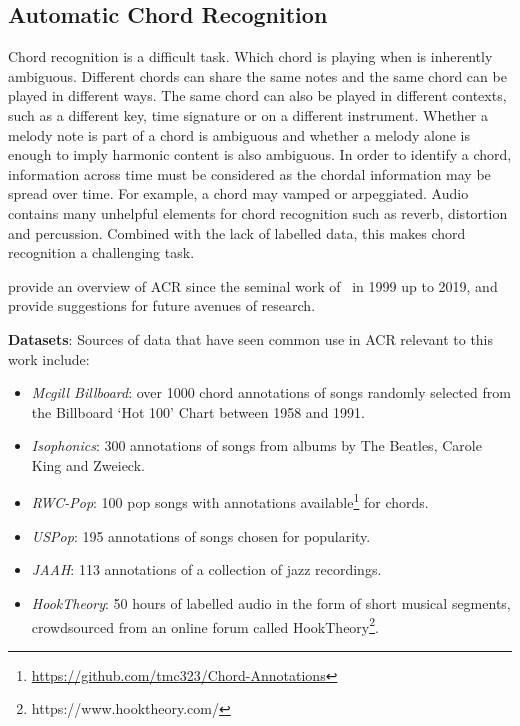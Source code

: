 \subsection{Automatic Chord Recognition}\label{sec:background-acr}

Chord recognition is a difficult task. Which chord is playing when is inherently ambiguous. Different chords can share the same notes and the same chord can be played in different ways. The same chord can also be played in different contexts, such as a different key, time signature or on a different instrument. Whether a melody note is part of a chord is ambiguous and whether a melody alone is enough to imply harmonic content is also ambiguous. In order to identify a chord, information across time must be considered as the chordal information may be spread over time. For example, a chord may vamped or arpeggiated. Audio contains many unhelpful elements for chord recognition such as reverb, distortion and percussion. Combined with the lack of labelled data, this makes chord recognition a challenging task.

\citet{20YearsofACR} provide an overview of ACR since the seminal work of~\citet{FujishimaACR} in 1999 up to 2019, and provide suggestions for future avenues of research.


\textbf{Datasets}: Sources of data that have seen common use in ACR relevant to this work include:
\begin{itemize}
    \item \emph{Mcgill Billboard}: over 1000 chord annotations of songs randomly selected from the Billboard `Hot 100' Chart between 1958 and 1991.~\citep{McgillBillboard}
    \item \emph{Isophonics}: 300 annotations of songs from albums by The Beatles, Carole King and Zweieck.~\citep{Isophonics}
    \item \emph{RWC-Pop}: 100 pop songs with annotations available\footnote{\url{https://github.com/tmc323/Chord-Annotations}} for chords.~\citep{RWC}
    \item \emph{USPop}: 195 annotations of songs chosen for popularity.~\citep{USPop}
    \item \emph{JAAH}: 113 annotations of a collection of jazz recordings.~\citep{JAAH}
    \item \emph{HookTheory}: 50 hours of labelled audio in the form of short musical segments, crowdsourced from an online forum called HookTheory\footnote{https://www.hooktheory.com/}.~\citep{MelodyTranscriptionViaGenerativePreTraining}
\end{itemize}

